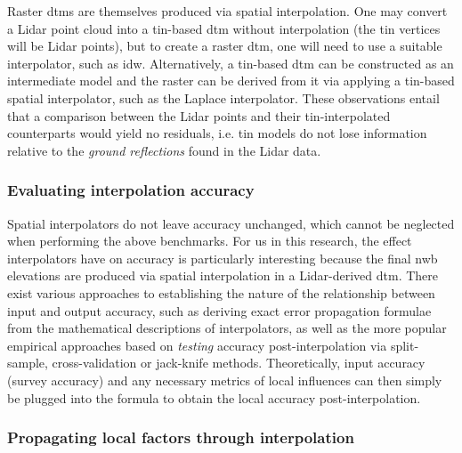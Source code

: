 Raster \ac{dtm}s are themselves produced via spatial interpolation. One may convert a Lidar point cloud into a \ac{tin}-based \ac{dtm} without interpolation (the \ac{tin} vertices will be Lidar points), but to create a raster \ac{dtm}, one will need to use a suitable interpolator, such as \ac{idw}. Alternatively, a \ac{tin}-based \ac{dtm} can be constructed as an intermediate model and the raster can be derived from it via applying a \ac{tin}-based spatial interpolator, such as the Laplace interpolator. These observations entail that a comparison between the Lidar points and their \ac{tin}-interpolated counterparts would yield no residuals, i.e. \ac{tin} models do not lose information relative to the \textit{ground reflections} found in the Lidar data.

\subsubsection{Evaluating interpolation accuracy}

Spatial interpolators do not leave accuracy unchanged, which cannot be neglected when performing the above benchmarks. For us in this research, the effect interpolators have on accuracy is particularly interesting because the final \ac{nwb} elevations are produced via spatial interpolation in a Lidar-derived \ac{dtm}. There exist various approaches to establishing the nature of the relationship between input and output accuracy, such as deriving exact error propagation formulae from the mathematical descriptions of interpolators, as well as the more popular empirical approaches based on \textit{testing} accuracy post-interpolation via split-sample, cross-validation or jack-knife methods. Theoretically, input accuracy (survey accuracy) and any necessary metrics of local influences can then simply be plugged into the formula to obtain the local accuracy post-interpolation.

\subsubsection{Propagating local factors through interpolation}

